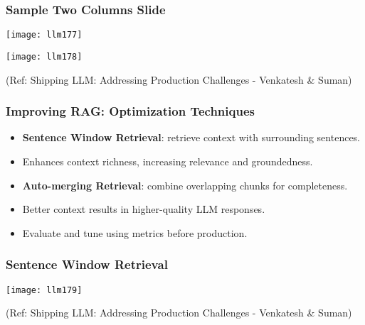 \begin{frame}[fragile]\frametitle{Sample Two Columns Slide}
		\begin{center}
		\texttt{[image: llm177]}
		\end{center}  
		\begin{center}
		\texttt{[image: llm178]}
		\end{center}  
  
	{\tiny (Ref: Shipping LLM: Addressing Production Challenges - Venkatesh \& Suman)}
  
\end{frame}


\begin{frame}[fragile]\frametitle{Improving RAG: Optimization Techniques}
  \begin{itemize}
    \item \textbf{Sentence Window Retrieval}: retrieve context with surrounding sentences.
    \item Enhances context richness, increasing relevance and groundedness.
    \item \textbf{Auto-merging Retrieval}: combine overlapping chunks for completeness.
    \item Better context results in higher-quality LLM responses.
    \item Evaluate and tune using metrics before production.
  \end{itemize}
\end{frame}

\begin{frame}[fragile]\frametitle{Sentence Window Retrieval}

	\begin{center}
	\texttt{[image: llm179]}
	
	{\tiny (Ref: Shipping LLM: Addressing Production Challenges - Venkatesh \& Suman)}
	\end{center}   
\end{frame}


